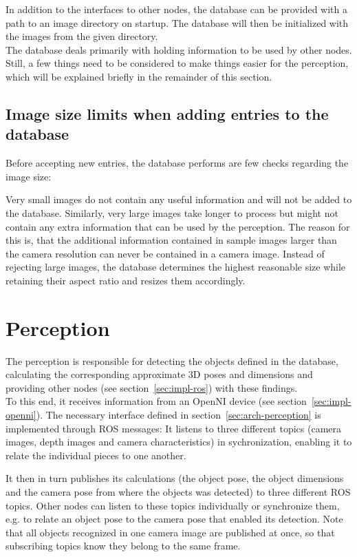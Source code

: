 In addition to the interfaces to other nodes, the database can be provided with a path to an image directory on startup. The database will then be initialized with the images from the given directory. \\

The database deals primarily with holding information to be used by other nodes. Still, a few things need to be considered to make things easier for the perception, which will be explained briefly in the remainder of this section.

\subsection{Image size limits when adding entries to the database}
\label{sec:impl-db-limits}
Before accepting new entries, the database performs are few checks regarding the image size:

Very small images do not contain any useful information and will not be added to the database. Similarly, very large images take longer to process but might not contain any extra information that can be used by the perception. The reason for this is, that the additional information contained in sample images larger than the camera resolution can never be contained in a camera image. Instead of rejecting large images, the database determines the highest reasonable size while retaining their aspect ratio and resizes them accordingly.


\section{Perception}
\label{sec:impl-perception}
The perception is responsible for detecting the objects defined in the database, calculating the corresponding approximate 3D poses and dimensions and providing other nodes (see section~\ref{sec:impl-ros}) with these findings. \\

To this end, it receives information from an OpenNI device (see section~\ref{sec:impl-openni}). The necessary interface defined in section~\ref{sec:arch-perception} is implemented through ROS messages: It listens to three different topics (camera images, depth images and camera characteristics) in sychronization, enabling it to relate the individual pieces to one another.

It then in turn publishes its calculations (the object pose, the object dimensions and the camera pose from where the objects was detected) to three different ROS topics. Other nodes can listen to these topics individually or synchronize them, e.g. to relate an object pose to the camera pose that enabled its detection. Note that all objects recognized in one camera image are published at once, so that subscribing topics know they belong to the same frame. \\

